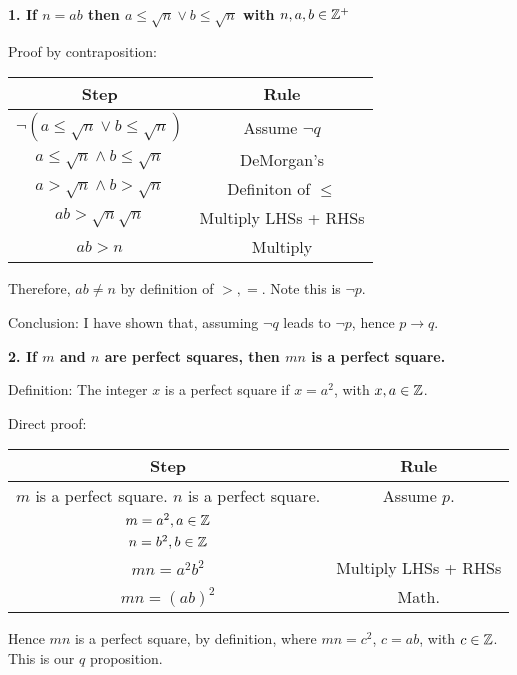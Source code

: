 \documentclass{exam}
\begin{document}
	\textbf{1. If $n = ab$ then $a \leq \sqrt{n} \lor b \leq \sqrt{n}$ with $n, a, b \in \Bbb Z^+$}
	
	Proof by contraposition:
	
	\begin{tabular}{c|c}
		Step&Rule\\
		\hline
		$\neg(a \leq \sqrt{n} \lor b \leq \sqrt{n})$ & Assume $\neg q$\\
		
		$a \leq \sqrt{n} \wedge b \leq \sqrt{n}$ & DeMorgan's\\
		
		$a > \sqrt{n} \wedge b > \sqrt{n}$ & Definiton of $\leq$\\
		
		$ab > \sqrt{n}\sqrt{n}$ & Multiply LHSs + RHSs\\
		
		$ab > n$ & Multiply\\
	\end{tabular}
	
	Therefore, $ab \neq n$ by definition of $>, =$. Note this is $\neg p$.
	
	Conclusion: I have shown that, assuming $\neg q$ leads to $\neg p$, hence $p \rightarrow q$. \newline
	
	\textbf{2. If $m$ and $n$ are perfect squares, then $mn$ is a perfect square.}
	
	Definition: The integer $x$ is a perfect square if $x = a^2$, with $x, a \in \Bbb Z$.
	
	Direct proof:
	
	\begin{tabular}{c|c}
		Step&Rule\\
		\hline
		$m$ is a perfect square. $n$ is a perfect square. &Assume $p$.\\
		
		$m = a^2, a \in \Bbb Z$&\\
		
		$n = b^2, b \in \Bbb Z$&\\
		
		$mn = a^2 b^2$ &Multiply LHSs + RHSs\\
		
		$mn = (ab)^2$ &Math.\\
	\end{tabular}
	
	Hence $mn$ is a perfect square, by definition, where $mn = c^2$, $c=ab$, with $c \in \Bbb Z$. This is our $q$ proposition.
	
\end{document}
